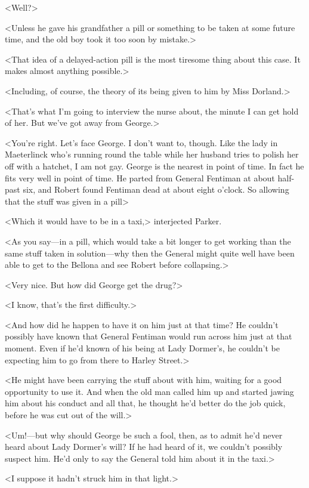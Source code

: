 <Well?>

<Unless he gave his grandfather a pill or something to be taken at some future time, and the old boy took it too soon by mistake.>

<That idea of a delayed-action pill is the most tiresome thing about this case. It makes almost anything possible.>

<Including, of course, the theory of its being given to him by Miss Dorland.>

<That's what I'm going to interview the nurse about, the minute I can get hold of her. But we've got away from George.>

<You're right. Let's face George. I don't want to, though. Like the lady in Maeterlinck who's running round the table while her husband tries to polish her off with a hatchet, I am not gay. George is the nearest in point of time. In fact he fits very well in point of time. He parted from General Fentiman at about half-past six, and Robert found Fentiman dead at about eight o'clock. So allowing that the stuff was given in a pill\longdash>

<Which it would have to be in a taxi,> interjected Parker.

<As you say—in a pill, which would take a bit longer to get working than the same stuff taken in solution—why then the General might quite well have been able to get to the Bellona and see Robert before collapsing.>

<Very nice. But how did George get the drug?>

<I know, that's the first difficulty.>

<And how did he happen to have it on him just at that time? He couldn't possibly have known that General Fentiman would run across him just at that moment. Even if he'd known of his being at Lady Dormer's, he couldn't be expecting him to go from there to Harley Street.>

<He might have been carrying the stuff about with him, waiting for a good opportunity to use it. And when the old man called him up and started jawing him about his conduct and all that, he thought he'd better do the job quick, before he was cut out of the will.>

<Um!—but why should George be such a fool, then, as to admit he'd never heard about Lady Dormer's will? If he had heard of it, we couldn't possibly suspect him. He'd only to say the General told him about it in the taxi.>

<I suppose it hadn't struck him in that light.>

